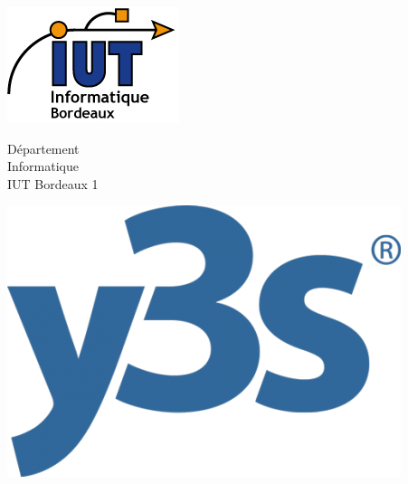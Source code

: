 \documentclass[a4paper,12pt]{book}
\theoremstyle{break}
\begin{document}

\begin{titlepage}
\centering
\sffamily

\begin{minipage}[b]{0.25\linewidth}
  \includegraphics[width=\linewidth]{logo_dut}

  \small
  Département\\
  Informatique\\
  IUT Bordeaux 1
\end{minipage}
\hspace{0.25\linewidth}
\begin{minipage}[b]{0.25\linewidth}
  \includegraphics[width=\linewidth]{logo_y3s}


\end{minipage}
\end{titlepage}
\end{document}
